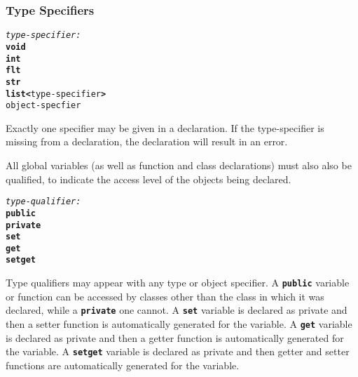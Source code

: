 \documentclass[12pt]{report}
\begin{document}
\subsubsection{Type Specifiers}
\begin{alltt}
         \textit{type-specifier:}
              \textbf{void}
              \textbf{int}
              \textbf{flt}
              \textbf{str}
              \textbf{list<}type-specifier\textbf{>}
              object-specfier
\end{alltt}
\begin{doublespace}

Exactly one specifier may be given in a declaration. If the type-specifier is missing from a declaration, the declaration will result in an error.

All global variables (as well as function and class declarations) must also also be qualified, to indicate the access level of the objects being declared.
\end{doublespace}
\begin{alltt}
         \textit{type-qualifier:}
              \textbf{public}
              \textbf{private}
              \textbf{set}
              \textbf{get}
              \textbf{setget}
\end{alltt}
\begin{doublespace}

Type qualifiers may appear with any type or object specifier. A \textbf{\texttt{public}} variable or function can be accessed by classes other than the class in which it was declared, while a \textbf{\texttt{private}} one cannot. A \textbf{\texttt{set}} variable is declared as private and then a setter function is automatically generated for the variable. A \textbf{\texttt{get}} variable is declared as private and then a getter function is automatically generated for the variable. A \textbf{\texttt{setget}} variable is declared as private and then getter and setter functions are automatically generated for the variable.
\end{doublespace}
\end{document}
